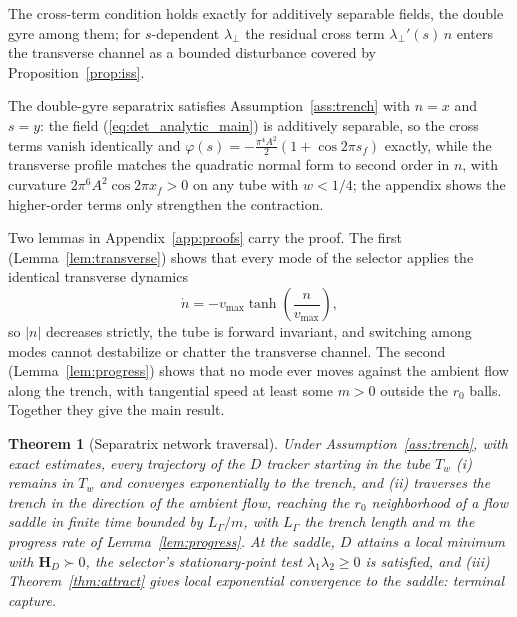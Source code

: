 \documentclass[lettersize,journal]{IEEEtran}
\newtheorem{theorem}{Theorem}
\begin{document}
The cross-term condition holds exactly for additively separable
fields, the double gyre among them; for $s$-dependent $\lambda_\perp$
the residual cross term $\lambda_\perp'(s)\,n$ enters the transverse
channel as a bounded disturbance covered by
Proposition~\ref{prop:iss}.

The double-gyre separatrix satisfies Assumption~\ref{ass:trench} with
$n = x$ and $s = y$: the field (\ref{eq:det_analytic_main}) is
additively separable, so the cross terms vanish identically and
$\varphi(s) = -\tfrac{\pi^4 A^2}{2}(1 + \cos 2\pi s_f)$ exactly, while
the transverse profile matches the quadratic normal form to second
order in $n$, with curvature $2\pi^6 A^2 \cos 2\pi x_f > 0$ on any tube
with $w < 1/4$; the appendix shows the higher-order terms only
strengthen the contraction.

Two lemmas in Appendix~\ref{app:proofs} carry the proof. The first
(Lemma~\ref{lem:transverse}) shows that every mode of the selector
applies the identical transverse dynamics
\begin{equation}
    \dot{n} = -v_{\max}\tanh\!\left(\frac{n}{v_{\max}}\right),
    \label{eq:n_dynamics}
\end{equation}
so $|n|$ decreases strictly, the tube is forward invariant, and
switching among modes cannot destabilize or chatter the transverse
channel. The second (Lemma~\ref{lem:progress}) shows that no mode ever
moves against the ambient flow along the trench, with tangential speed
at least some $m > 0$ outside the $r_0$ balls. Together they give the
main result.

\begin{theorem}[Separatrix network traversal]
\label{thm:separatrix}
Under Assumption~\ref{ass:trench}, with exact estimates, every
trajectory of the $D$ tracker starting in the tube $T_w$ (i) remains in
$T_w$ and converges exponentially to the trench, and (ii) traverses the
trench in the direction of the ambient flow, reaching the $r_0$
neighborhood of a flow saddle in finite time bounded by $L_\Gamma/m$,
with $L_\Gamma$ the trench length and $m$ the progress rate of
Lemma~\ref{lem:progress}. At the saddle, $D$ attains a local minimum
with $\mathbf{H}_D \succ 0$, the selector's stationary-point test
$\lambda_1\lambda_2 \geq 0$ is satisfied, and (iii)
Theorem~\ref{thm:attract} gives local exponential convergence to the
saddle: terminal capture.
\end{theorem}
\end{document}
